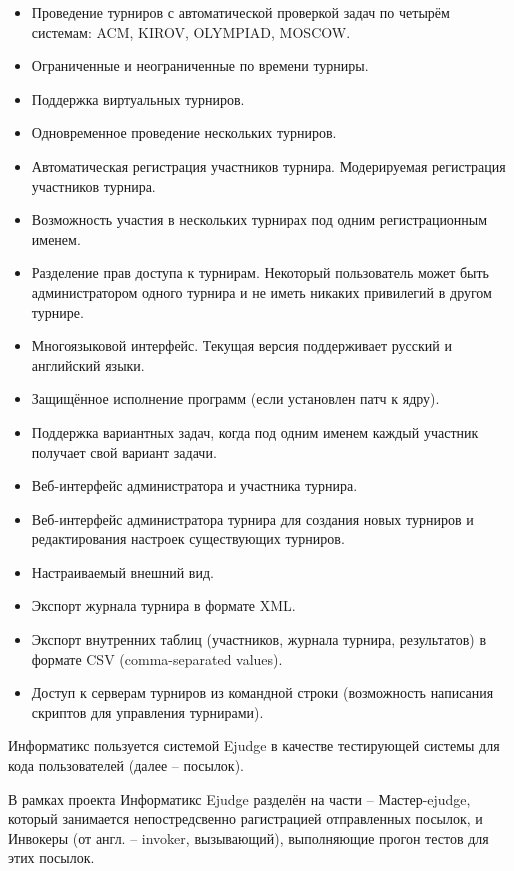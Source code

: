 \begin{itemize}
    \item Проведение турниров с автоматической проверкой задач по четырём системам: ACM, KIROV, OLYMPIAD, MOSCOW.
    \item Ограниченные и неограниченные по времени турниры.
    \item Поддержка виртуальных турниров.
    \item Одновременное проведение нескольких турниров.
    \item Автоматическая регистрация участников турнира. Модерируемая регистрация участников турнира.
    \item Возможность участия в нескольких турнирах под одним регистрационным именем.
    \item Разделение прав доступа к турнирам. Некоторый пользователь может быть администратором одного турнира и не иметь никаких привилегий в другом турнире.
    \item Многоязыковой интерфейс. Текущая версия поддерживает русский и английский языки.
    \item Защищённое исполнение программ (если установлен патч к ядру).
    \item Поддержка вариантных задач, когда под одним именем каждый участник получает свой вариант задачи.
    \item Веб-интерфейс администратора и участника турнира.
    \item Веб-интерфейс администратора турнира для создания новых турниров и редактирования настроек существующих турниров.
    \item Настраиваемый внешний вид.
    \item Экспорт журнала турнира в формате XML.
    \item Экспорт внутренних таблиц (участников, журнала турнира, результатов) в формате CSV (comma-separated values).
    \item Доступ к серверам турниров из командной строки (возможность написания скриптов для управления турнирами).

\end{itemize}

Информатикс пользуется системой Ejudge в качестве тестирующей системы для кода пользователей (далее -- посылок).

В рамках проекта Информатикс Ejudge разделён на части -- Мастер-ejudge, который занимается непостредсвенно рагистрацией отправленных посылок, и Инвокеры (от англ. -- invoker, вызывающий), выполняющие прогон тестов для этих посылок. 

